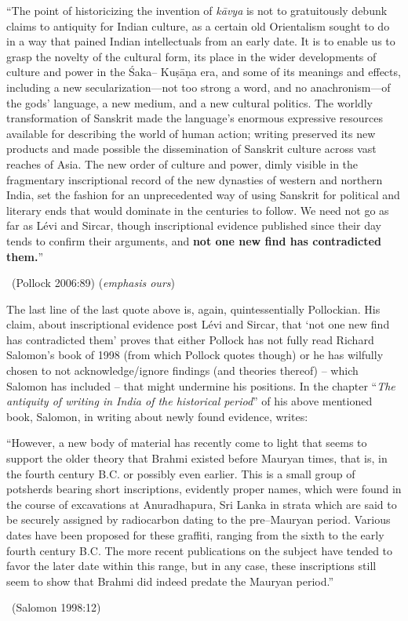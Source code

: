 \begin{myquote}
“The point of historicizing the invention of \textit{kāvya} is not to gratuitously debunk claims to antiquity for Indian culture, as a certain old Orientalism sought to do in a way that pained Indian intellectuals from an early date. It is to enable us to grasp the novelty of the cultural form, its place in the wider developments of culture and power in the Śaka– Kuṣāṇa era, and some of its meanings and effects, including a new secularization—not too strong a word, and no anachronism—of the gods’ language, a new medium, and a new cultural politics. The worldly transformation of Sanskrit made the language’s enormous expressive resources available for describing the world of human action; writing preserved its new products and made possible the dissemination of Sanskrit culture across vast reaches of Asia. The new order of culture and power, dimly visible in the fragmentary inscriptional record of the new dynasties of western and northern India, set the fashion for an unprecedented way of using Sanskrit for political and literary ends that would dominate in the centuries to follow. We need not go as far as Lévi and Sircar, though inscriptional evidence published since their day tends to confirm their arguments, and \textbf{not one new find has contradicted them.}” 

~\hfill (Pollock 2006:89) (\textit{emphasis ours})
\end{myquote}

The last line of the last quote above is, again, quintessentially Pollockian. His claim, about inscriptional evidence post Lévi and Sircar, that ‘not one new find has contradicted them’ proves that either Pollock has not fully read Richard Salomon’s book of 1998 (from which Pollock quotes though) or he has wilfully chosen to not acknowledge/ignore findings (and theories thereof) – which Salomon has included – that might undermine his positions. In the chapter “\textit{The antiquity of writing in India of the historical period}” of his above mentioned book, Salomon, in writing about newly found evidence, writes:

\begin{myquote}
“However, a new body of material has recently come to light that seems to support the older theory that Brahmi existed before Mauryan times, that is, in the fourth century B.C. or possibly even earlier. This is a small group of potsherds bearing short inscriptions, evidently proper names, which were found in the course of excavations at Anuradhapura, Sri Lanka in strata which are said to be securely assigned by radiocarbon dating to the pre–Mauryan period. Various dates have been proposed for these graffiti, ranging from the sixth to the early fourth century B.C. The more recent publications on the subject have tended to favor the later date within this range, but in any case, these inscriptions still seem to show that Brahmi did indeed predate the Mauryan period.” 

~\hfill (Salomon 1998:12)
\end{myquote}

